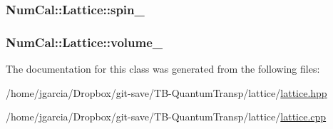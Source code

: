 \hypertarget{classNumCal_1_1Lattice_a9fad149348681fccd17f2b714d18a329}{
\subsubsection[{spin\+\_\+}]{ Num\+Cal\+::\+Lattice\+::spin\+\_\+\hspace{0.3cm}{\ttfamily [private]}}}\label{classNumCal_1_1Lattice_a9fad149348681fccd17f2b714d18a329}
\hypertarget{classNumCal_1_1Lattice_aa21f4eee7d70942ab703f78fc052ed9e}{
\subsubsection[{volume\+\_\+}]{ Num\+Cal\+::\+Lattice\+::volume\+\_\+}}\label{classNumCal_1_1Lattice_aa21f4eee7d70942ab703f78fc052ed9e}


The documentation for this class was generated from the following files\+:\begin{DoxyCompactItemize}
\item 
/home/jgarcia/\+Dropbox/git-\/save/\+T\+B-\/\+Quantum\+Transp/lattice/\hyperlink{lattice_8hpp}{lattice.\+hpp}\item 
/home/jgarcia/\+Dropbox/git-\/save/\+T\+B-\/\+Quantum\+Transp/lattice/\hyperlink{lattice_8cpp}{lattice.\+cpp}\end{DoxyCompactItemize}
